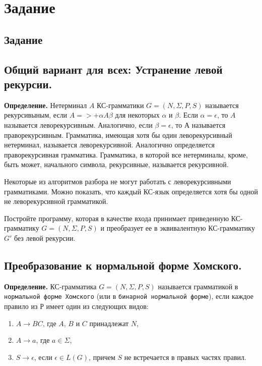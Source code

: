 \chapter{Задание}

\section{Задание}

\section{Общий вариант для всех: Устранение левой рекурсии.}

\textbf{Определение.} Нетерминал $A$ КС-грамматики $G = (N, \Sigma, P, S)$ называется рекурсивыным, если $A =>+ \alpha A \beta$ для некоторых $\alpha$ и $\beta$. Если $\alpha = \epsilon$, то $A$ называется леворекурсивным. Аналогично, если $\beta = \epsilon$, то $А$ называется праворекурсивным. Грамматика, имеющая хотя бы один леворекурсивный нетерминал, называется леворекурсивной. Аналогично определяется праворекурсивная грамматика. Грамматика, в которой все нетерминалы, кроме, быть может, начального символа, рекурсивные, называется рекурсивной.

Некоторые из алгоритмов разбора не могут работать с леворекурсивными грамматиками. Можно показать, что каждый КС-язык определяется хотя бы одной не леворекурсивной грамматикой.

Постройте программу, которая в качестве входа принимает приведенную КС-грамматику $G = (N, \Sigma, P, S)$ и преобразует ее в эквивалентную КС-грамматику $G'$ без левой рекурсии.

\section{Преобразование к нормальной форме Хомского.}

\textbf{Определение.} КС-грамматика $G = (N, \Sigma, P, S)$ называется грамматикой в \texttt{нормальной форме Хомского} (или в \texttt{бинарной нормальной форме}), если каждое правило из $Р$ имеет один из следующих видов:
\begin{enumerate}
  \item $A \rightarrow BC$, где $A$, $B$ и $C$ принадлежат $N$,
  \item $A \rightarrow a$, где $a \in \Sigma$,
  \item $S \rightarrow \epsilon$, если $\epsilon \in L(G)$, причем $S$ не встречается в правых частях правил.
\end{enumerate}

